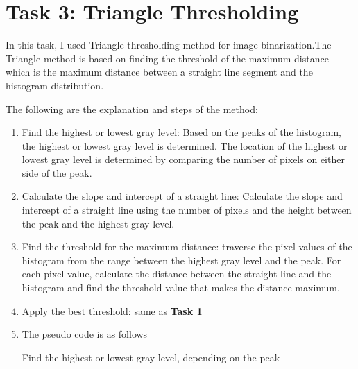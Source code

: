 \documentclass[11pt]{report}
\begin{document}
\section*{Task 3: Triangle Thresholding}

In this task, I used Triangle thresholding method for image binarization.The Triangle method is based on finding the threshold of the maximum distance which is the maximum distance between a straight line segment and the histogram distribution.

The following are the explanation and steps of the method:
\begin{enumerate}
    \item Find the highest or lowest gray level: Based on the peaks of the histogram, the highest or lowest gray level is determined. The location of the highest or lowest gray level is determined by comparing the number of pixels on either side of the peak.
    \item Calculate the slope and intercept of a straight line: Calculate the slope and intercept of a straight line using the number of pixels and the height between the peak and the highest gray level.
    \item Find the threshold for the maximum distance: traverse the pixel values of the histogram from the range between the highest gray level and the peak. For each pixel value, calculate the distance between the straight line and the histogram and find the threshold value that makes the distance maximum.
    \item Apply the best threshold: same as \textbf{Task 1}

    \item The pseudo code is as follows

    \begin{algorithm}[H]
        \caption{Find the highest or lowest gray level, depending on the peak}
    \end{algorithm}


\end{enumerate}
\end{document}
